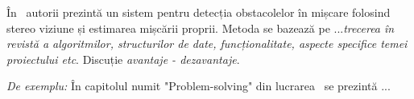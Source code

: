 În~\cite{AntoniouSBDB07} autorii prezintă un sistem pentru detecția obstacolelor în mișcare folosind stereo viziune și estimarea mișcării proprii.
Metoda se bazează pe ...{\it trecerea în revistă a algoritmilor, structurilor de date, funcționalitate, aspecte specifice temei proiectului etc}. Discuție {\it avantaje - dezavantaje}.


\textit{De exemplu:} În capitolul numit "Problem-solving" din lucrarea~\cite{russell1995artificial} se prezintă ...

